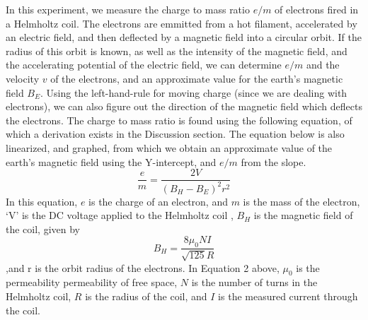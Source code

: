 \documentclass[letterpaper]{article}
\begin{document}
In this experiment, we measure the charge to mass ratio $e/m$ of electrons fired in a
Helmholtz coil.
The electrons are emmitted from a hot filament, accelerated by an electric field, and then deflected
by a magnetic field into a circular orbit. If the radius of this orbit is known,
as well as the intensity of the magnetic field, and the accelerating potential of the
electric field, we can determine $e/m$ and the velocity $v$ of the electrons, and an approximate value for
the earth's magnetic field $B_E$. Using the left-hand-rule for moving charge (since we are
dealing with electrons), we can also figure out the direction of the magnetic field which deflects the electrons.
The charge to mass ratio is found using the following equation, of which a derivation exists in the Discussion section.
The equation below is also linearized, and graphed, from which we obtain an approximate value of the earth's magnetic field using the
Y-intercept, and $e/m$ from the slope.
\begin{equation}
  \frac{e}{m} = \frac{2V}{(B_H-B_E)^2r^2}
\end{equation}
In this equation, $e$ is the charge of an electron, and $m$ is the mass of the electron, `V' is the DC voltage applied to the Helmholtz coil
, $B_H$ is the magnetic field of the coil, given by
\begin{equation}
  B_H=\frac{8\mu_0 NI}{ \sqrt{125} R}
\end{equation}
,and r is the orbit radius of the electrons. In Equation 2 above, $\mu_0$ is the permeability permeability of free space,
$N$ is the number of turns in the Helmholtz coil, $R$ is the radius of the coil, and $I$ is the measured current through the
coil.

\end{document}
